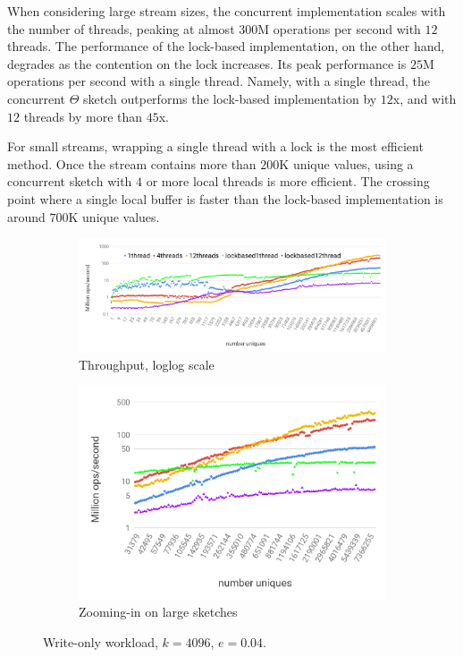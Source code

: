 When considering large stream sizes, the concurrent implementation scales with the number of threads, peaking at
almost $300$M operations per second with $12$ threads. The performance of the lock-based implementation, on the other hand,
degrades as the contention on the lock increases. Its peak performance is
$25$M operations per second with a single thread. Namely, with a single thread, the concurrent $\Theta$ sketch outperforms the lock-based implementation
by $12$x, and with $12$ threads by more than $45$x. 

For small streams, wrapping a single thread with a lock is the most efficient method. Once the stream
contains more than $200$K unique values, using a concurrent sketch with $4$ or more local threads is more efficient.
The crossing point where a single local buffer is faster than the lock-based implementation is around $700$K unique values.
 
\begin{figure}[tb]
\setlength{\abovecaptionskip}{0pt}
\setlength{\belowcaptionskip}{0pt}
\setlength\textfloatsep{0pt}
\centering
\begin{subfigure}{1.3\columnwidth}\centering
\includegraphics[width=\textwidth]{images/theta-write-only.png}
\caption{Throughput, loglog scale}
\label{fig:throughput:native}
\end{subfigure}
\begin{subfigure}{0.7\columnwidth}\centering
\includegraphics[width=\textwidth]{images/theta-write-only-zoomin.png}
\caption{Zooming-in on large sketches}
\label{fig:throughput:large}
\end{subfigure}
  \caption{Write-only workload, $k = 4096$, $e=0.04$.}
  \label{fig:throughput}
\end{figure}


